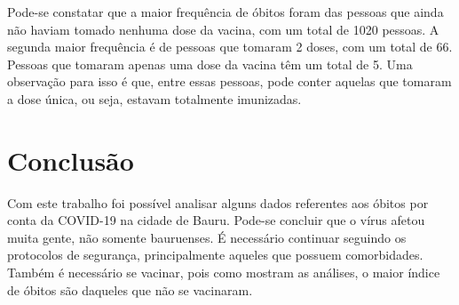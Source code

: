 \documentclass[
  brazilian,
]{article}
\begin{document}
Pode-se constatar que a maior frequência de óbitos foram das pessoas que
ainda não haviam tomado nenhuma dose da vacina, com um total de 1020
pessoas. A segunda maior frequência é de pessoas que tomaram 2 doses,
com um total de 66. Pessoas que tomaram apenas uma dose da vacina têm um
total de 5. Uma observação para isso é que, entre essas pessoas, pode
conter aquelas que tomaram a dose única, ou seja, estavam totalmente
imunizadas.

\hypertarget{conclusuxe3o}{%
\section{Conclusão}\label{conclusuxe3o}}

Com este trabalho foi possível analisar alguns dados referentes aos
óbitos por conta da COVID-19 na cidade de Bauru. Pode-se concluir que o
vírus afetou muita gente, não somente bauruenses. É necessário continuar
seguindo os protocolos de segurança, principalmente aqueles que possuem
comorbidades. Também é necessário se vacinar, pois como mostram as
análises, o maior índice de óbitos são daqueles que não se vacinaram.
\end{document}
